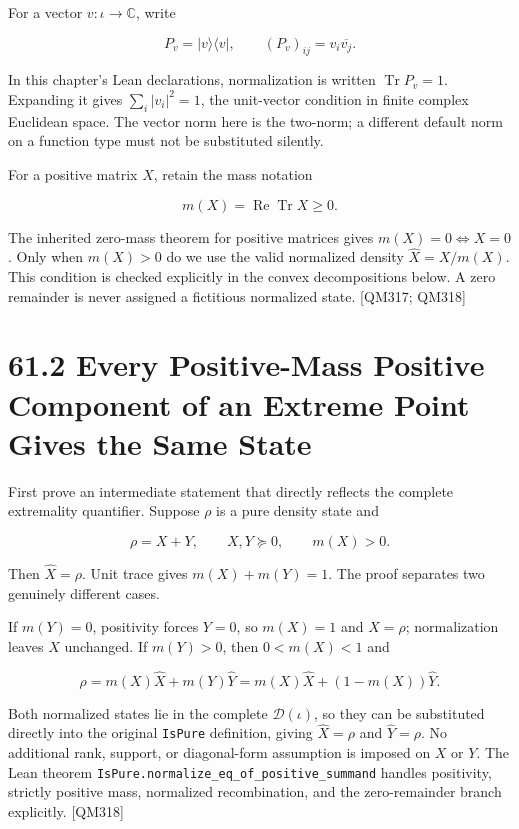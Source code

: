 \documentclass[
  11pt,
  oneside]{book}
\begin{document}
For a vector \(v:\iota\to\mathbb C\), write

\[
P_v=|v\rangle\langle v|,
\qquad (P_v)_{ij}=v_i\overline{v_j}.
\]

In this chapter's Lean declarations, normalization is written
\(\operatorname{Tr}P_v=1\). Expanding it gives \(\sum_i|v_i|^2=1\), the
unit-vector condition in finite complex Euclidean space. The vector norm
here is the two-norm; a different default norm on a function type must
not be substituted silently.

For a positive matrix \(X\), retain the mass notation

\[
m(X)=\operatorname{Re}\operatorname{Tr}X\ge0.
\]

The inherited zero-mass theorem for positive matrices gives
\(m(X)=0\iff X=0\). Only when \(m(X)>0\) do we use the valid normalized
density \(\widehat X=X/m(X)\). This condition is checked explicitly in
the convex decompositions below. A zero remainder is never assigned a
fictitious normalized state. {[}QM317; QM318{]}

\section{61.2 Every Positive-Mass Positive Component of an Extreme Point
Gives the Same State}

First prove an intermediate statement that directly reflects the
complete extremality quantifier. Suppose \(\rho\) is a pure density
state and

\[
\rho=X+Y,\qquad X,Y\succeq0,\qquad m(X)>0.
\]

Then \(\widehat X=\rho\). Unit trace gives \(m(X)+m(Y)=1\). The proof
separates two genuinely different cases.

If \(m(Y)=0\), positivity forces \(Y=0\), so \(m(X)=1\) and \(X=\rho\);
normalization leaves \(X\) unchanged. If \(m(Y)>0\), then \(0<m(X)<1\)
and

\[
\rho=m(X)\widehat X+m(Y)\widehat Y
=m(X)\widehat X+(1-m(X))\widehat Y.
\]

Both normalized states lie in the complete \(\mathcal D(\iota)\), so
they can be substituted directly into the original \texttt{Is\allowbreak Pure}
definition, giving \(\widehat X=\rho\) and \(\widehat Y=\rho\). No
additional rank, support, or diagonal-form assumption is imposed on
\(X\) or \(Y\). The Lean theorem
\texttt{Is\allowbreak Pure.\allowbreak normalize\_\allowbreak eq\_\allowbreak of\_\allowbreak positive\_\allowbreak summand} handles positivity,
strictly positive mass, normalized recombination, and the zero-remainder
branch explicitly. {[}QM318{]}
\end{document}
